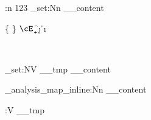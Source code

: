 \documentclass[12pt]{article}
\begin{document}
\ExplSyntaxOn
\pretty:n {123}
\tl_set:Nn \__content {
	\cB \a \cE \z
	\cB \{ \cE \}
	\cB \( \cE \)
	\cM \b
	\cT \c
	\cP \d
	\cU \e
	\cD \f
	\cS \j
	\cL \g
	\cO \h
	\cA \i \cA {\~\ }
	
	\cM \  %
	\cT \  %
	\cP \  %
	\cU \  %
	\cD \  %
	\cS \  %
	\cL \  %
	\cO \  %
}
\precattl_set:NV \__tmp \__content

\tl_analysis_map_inline:Nn \__content {}

\pretty:V \__tmp
\ExplSyntaxOff
\end{document}
